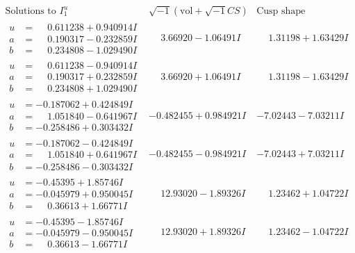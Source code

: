 \documentclass[1p]{elsarticle_modified}
\theoremstyle{definition}
\newcommand{\I}{\sqrt{-1}}
\begin{document}
$$\begin{array}{c|c|c}  
\text{Solutions to }I^u_{1}& \I (\text{vol} + \sqrt{-1}CS) & \text{Cusp shape}\\
 \hline 
\begin{aligned}
u &= \phantom{-}0.611238 + 0.940914 I \\
a &= \phantom{-}0.190317 - 0.232859 I \\
b &= \phantom{-}0.234808 - 1.029490 I\end{aligned}
 & \phantom{-}3.66920 - 1.06491 I & \phantom{-}1.31198 + 1.63429 I \\ \hline\begin{aligned}
u &= \phantom{-}0.611238 - 0.940914 I \\
a &= \phantom{-}0.190317 + 0.232859 I \\
b &= \phantom{-}0.234808 + 1.029490 I\end{aligned}
 & \phantom{-}3.66920 + 1.06491 I & \phantom{-}1.31198 - 1.63429 I \\ \hline\begin{aligned}
u &= -0.187062 + 0.424849 I \\
a &= \phantom{-}1.051840 - 0.641967 I \\
b &= -0.258486 + 0.303432 I\end{aligned}
 & -0.482455 + 0.984921 I & -7.02443 - 7.03211 I \\ \hline\begin{aligned}
u &= -0.187062 - 0.424849 I \\
a &= \phantom{-}1.051840 + 0.641967 I \\
b &= -0.258486 - 0.303432 I\end{aligned}
 & -0.482455 - 0.984921 I & -7.02443 + 7.03211 I \\ \hline\begin{aligned}
u &= -0.45395 + 1.85746 I \\
a &= -0.045979 + 0.950045 I \\
b &= \phantom{-}0.36613 + 1.66771 I\end{aligned}
 & \phantom{-}12.93020 - 1.89326 I & \phantom{-}1.23462 + 1.04722 I \\ \hline\begin{aligned}
u &= -0.45395 - 1.85746 I \\
a &= -0.045979 - 0.950045 I \\
b &= \phantom{-}0.36613 - 1.66771 I\end{aligned}
 & \phantom{-}12.93020 + 1.89326 I & \phantom{-}1.23462 - 1.04722 I \\ \hline\begin{aligned}

\end{aligned}
\end{array}$$
\end{document}
